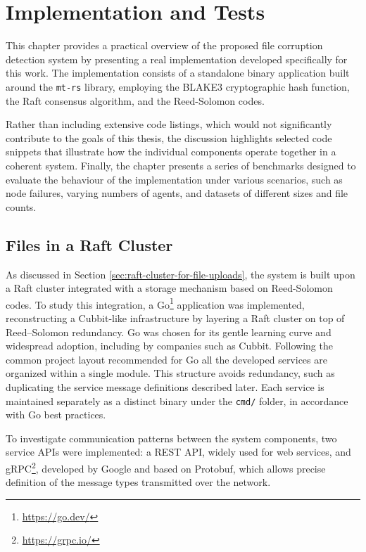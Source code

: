 \chapter{Implementation and Tests}

This chapter provides a practical overview of the proposed file corruption detection system by presenting a real implementation developed specifically for this work. The implementation consists of a standalone binary application built around the \texttt{mt-rs} library, employing the BLAKE3 cryptographic hash function, the Raft consensus algorithm, and the Reed-Solomon codes.

Rather than including extensive code listings, which would not significantly contribute to the goals of this thesis, the discussion highlights selected code snippets that illustrate how the individual components operate together in a coherent system. Finally, the chapter presents a series of benchmarks designed to evaluate the behaviour of the implementation under various scenarios, such as node failures, varying numbers of agents, and datasets of different sizes and file counts.

\section{Files in a Raft Cluster}

As discussed in Section \ref{sec:raft-cluster-for-file-uploads}, the system is built upon a Raft cluster integrated with a storage mechanism based on Reed-Solomon codes. To study this integration, a Go\footnote{\url{https://go.dev/}} application was implemented, reconstructing a Cubbit-like infrastructure by layering a Raft cluster on top of Reed–Solomon redundancy. Go was chosen for its gentle learning curve and widespread adoption, including by companies such as Cubbit. Following the common project layout recommended for Go\cite{go-modules-layout} all the developed services are organized within a single module. This structure avoids redundancy, such as duplicating the service message definitions described later. Each service is maintained separately as a distinct binary under the \texttt{cmd/} folder, in accordance with Go best practices.



To investigate communication patterns between the system components, two service APIs were implemented: a REST API, widely used for web services, and gRPC\footnote{\url{https://grpc.io/}}, developed by Google and based on Protobuf, which allows precise definition of the message types transmitted over the network.

